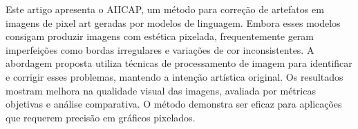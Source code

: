 {Este artigo apresenta o AIICAP, um método para correção de artefatos em imagens de pixel art geradas por modelos de linguagem. Embora esses modelos consigam produzir imagens com estética pixelada, frequentemente geram imperfeições como bordas irregulares e variações de cor inconsistentes. A abordagem proposta utiliza técnicas de processamento de imagem para identificar e corrigir esses problemas, mantendo a intenção artística original. Os resultados mostram melhora na qualidade visual das imagens, avaliada por métricas objetivas e análise comparativa. O método demonstra ser eficaz para aplicações que requerem precisão em gráficos pixelados.}